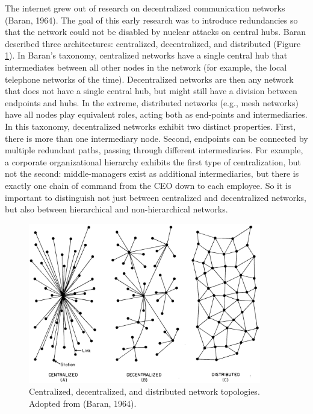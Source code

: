The internet grew out of research on decentralized communication networks (Baran, 1964). The goal of this early research was to introduce redundancies so that the network could not be disabled by nuclear attacks on central hubs. Baran described three architectures: centralized, decentralized, and distributed (Figure \ref{fig:decentralization}). In Baran's taxonomy, centralized networks have a single central hub that intermediates between all other nodes in the network (for example, the local telephone networks of the time). Decentralized networks are then any network that does not have a single central hub, but might still have a division between endpoints and hubs. In the extreme, distributed networks (e.g., mesh networks) have all nodes play equivalent roles, acting both as end-points and intermediaries. In this taxonomy, decentralized networks exhibit two distinct properties. First, there is more than one intermediary node. Second, endpoints can be connected by multiple redundant paths, passing through different intermediaries. For example, a corporate organizational hierarchy exhibits the first type of centralization, but not the second: middle-managers exist as additional intermediaries, but there is exactly one chain of command from the CEO down to each employee. So it is important to distinguish not just between centralized and decentralized networks, but also between hierarchical and non-hierarchical networks.

\begin{figure}
\centering
\includegraphics[width=4in]{images/fig-decentralized.png}
\caption{
Centralized, decentralized, and distributed network topologies. Adopted from (Baran, 1964).
\label{fig:decentralization}
}
\end{figure}


